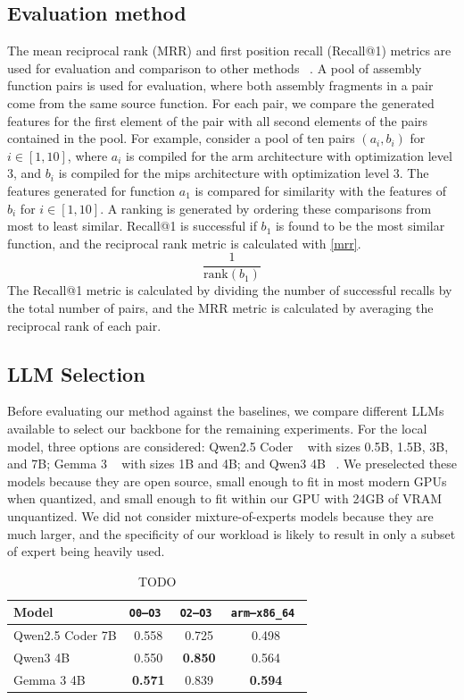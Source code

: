\subsection{Evaluation method}

The mean reciprocal rank (MRR) and first position recall (Recall@1) metrics are used for evaluation and comparison to other methods
~\cite{deprio,code-not-lang,Asm2Vec,CLAP,SAFE}.
A pool of assembly function pairs is used for evaluation, where both assembly fragments in a pair come from the same source function.
For each pair, we compare the generated features for the first element of the pair with all second elements of the pairs contained
in the pool.  For example, consider a pool of ten pairs \((a_i, b_i)\) for \(i \in [1, 10]\), where \(a_i\) is compiled for the arm
architecture with optimization level 3, and \(b_i\) is compiled for the mips architecture with optimization
level 3. The features generated for function \(a_1\) is compared for similarity with the features of \(b_i\) for \(i \in [1, 10]\).
A ranking is generated by ordering these comparisons from most to least similar. Recall@1 is successful
if \(b_1\) is found to be the most similar function, and the reciprocal rank metric is calculated with \ref{mrr}.
\begin{equation} \label{mrr}
\frac{1}{\text{rank}(b_1)}
\end{equation}
\noindent The Recall@1 metric is calculated by dividing the number of successful recalls by the total number of pairs, and the
MRR metric is calculated by averaging the reciprocal rank of each pair.

\subsection{LLM Selection}

Before evaluating our method against the baselines, we compare different LLMs available to select our backbone for the remaining experiments.
For the local model, three options are considered: Qwen2.5 Coder ~\cite{qwen2} with sizes 0.5B, 1.5B, 3B, and 7B;
Gemma 3 ~\cite{gemma3} with sizes 1B and 4B; and  Qwen3 4B ~\cite{qwen3}. We preselected these models because they are open source,
small enough to fit in most modern GPUs when quantized, and small enough to fit within our GPU with
24GB of VRAM unquantized. We did not consider mixture-of-experts models because they are much larger, and the specificity of our
workload is likely to result in only a subset of expert being heavily used.
{
    \renewcommand{\arraystretch}{1.1}
    \begin{table}[h]
    \centering
    \begin{tabular}{|l|ccc|} \hline
    Model            & \tt O0--O3 & \tt O2--O3 & \tt arm--x86\_64 \\ \hline
    Qwen2.5 Coder 7B & 0.558      & 0.725      & 0.498            \\
    Qwen3 4B         & 0.550      & \bf 0.850  & 0.564            \\
    Gemma 3 4B       & \bf 0.571  & 0.839      & \bf 0.594        \\ \hline
    \end{tabular}
    \caption{TODO}
    \end{table}
}

